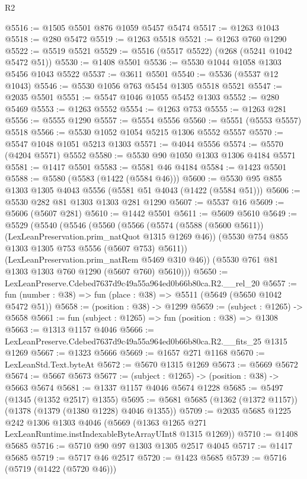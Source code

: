 \begin{lexlean}{R2}
\begin{coremodule}
@5516 := @1505 @5501 @876 @1059 @5457 @5474
@5517 := @1263 @1043
@5518 := @280 @5472
@5519 := @1263 @5518
@5521 := @1263 @760 @1290
@5522 := @5519 @5521
@5529 := @5516 (@5517 @5522) (@268 (@5241 @1042 @5472 @51))
@5530 := @1408 @5501
@5536 := @5530 @1044 @1058 @1303 @5456 @1043 @5522
@5537 := @3611 @5501
@5540 := @5536 (@5537 @12 @1043)
@5546 := @5530 @1056 @763 @5454 @1305 @5518 @5521
@5547 := @2035 @5501
@5551 := @5547 @1046 @1055 @5452 @1303
@5552 := @280 @5469
@5553 := @1263 @5552
@5554 := @1263 @753
@5555 := @1263 @281
@5556 := @5555 @1290
@5557 := @5554 @5556
@5560 := @5551 (@5553 @5557) @5518
@5566 := @5530 @1052 @1054 @5215 @1306 @5552 @5557
@5570 := @5547 @1048 @1051 @5213 @1303
@5571 := @4044 @5556
@5574 := @5570 (@4204 @5571) @5552
@5580 := @5530 @90 @1050 @1303 @1306 @4184 @5571
@5581 := @1417 @5501
@5583 := @5581 @46 @4184
@5584 := @1423 @5501
@5588 := @5580 (@5583 (@1422 (@5584 @46)))
@5600 := @5530 @95 @855 @1303 @1305 @4043 @5556 (@5581 @51 @4043 (@1422 (@5584 @51)))
@5606 := @5530 @282 @81 @1303 @1303 @281 @1290
@5607 := @5537 @16
@5609 := @5606 (@5607 @281)
@5610 := @1442 @5501
@5611 := @5609 @5610
@5649 := @5529
    (@5540
      (@5546
        (@5560
          (@5566
            (@5574 (@5588 (@5600 @5611)) (LexLeanPreservation.prim_natQuot @1315 @1269 @46))
            (@5530 @754 @855 @1303 @1305 @753 @5556 (@5607 @753) @5611))
          (LexLeanPreservation.prim_natRem @5469 @310 @46))
        (@5530 @761 @81 @1303 @1303 @760 @1290 (@5607 @760) @5610)))
@5650 := LexLeanPreserve.Cdebed7637d9c49a55a964ed0b66b80ca.R2.__rel_20
@5657 := fun (number : @38) => fun (place : @38) => @5511 (@5649 (@5650 @1042 @5472 @51))
@5658 := (position : @38) -> @1299
@5659 := (subject : @1265) -> @5658
@5661 := fun (subject : @1265) => fun (position : @38) => @1308
@5663 := @1313 @1157 @4046
@5666 := LexLeanPreserve.Cdebed7637d9c49a55a964ed0b66b80ca.R2.__fits_25 @1315 @1269
@5667 := @1323 @5666
@5669 := @1657 @271 @1168
@5670 := LexLeanStd.Text.byteAt
@5672 := @5670 @1315 @1269
@5673 := @5669 @5672
@5674 := @5667 @5673
@5677 := (subject : @1265) -> (position : @38) -> @5663 @5674
@5681 := @1337 @1157 @4046 @5674 @1228
@5685 := @5497 (@1345 (@1352 @2517) @1355)
@5695 := @5681 @5685 (@1362 (@1372 @1157)) (@1378 (@1379 (@1380 @1228) @4046 @1355))
@5709 := @2035
    @5685
    @1225
    @242
    @1306
    @1303
    @4046
    (@5669 (@1363 @1265 @271 LexLeanRuntime.instIndexableByteArrayUInt8 @1315 @1269))
@5710 := @1408 @5685
@5716 := @5710 @90 @97 @1303 @1305 @2517 @4045
@5717 := @1417 @5685
@5719 := @5717 @46 @2517
@5720 := @1423 @5685
@5739 := @5716
    (@5719 (@1422 (@5720 @46)))

\end{coremodule}
\end{lexlean}
